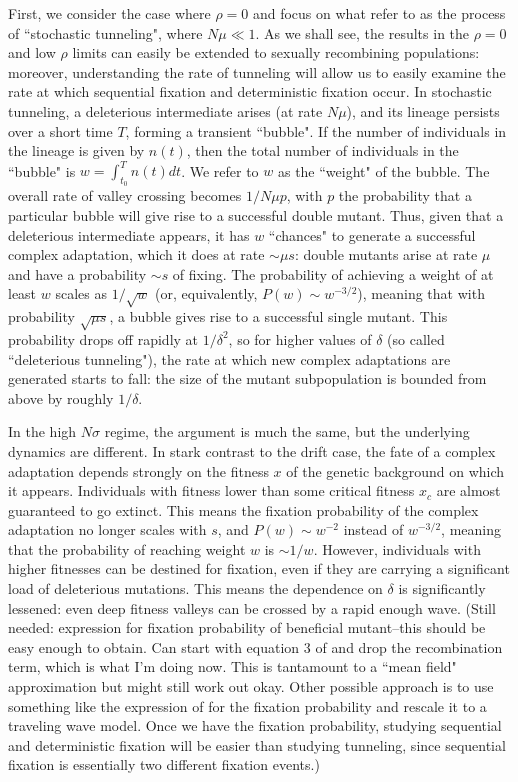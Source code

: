\documentclass[rmp]{revtex4}
\begin{document}
\iffalse
First, we consider the case where $\rho = 0$ and focus on what \citet{weissman_2009} refer to as the process of ``stochastic tunneling", where $N\mu \ll 1$.
As we shall see, the results in the $\rho = 0$ and low $\rho$ limits can easily be extended to sexually recombining populations: moreover, understanding the rate of tunneling will allow us to easily examine the rate at which sequential fixation and deterministic fixation occur.
In stochastic tunneling, a deleterious intermediate arises (at rate $N\mu$), and its lineage persists over a short time $T$, forming a transient ``bubble".
If the number of individuals in the lineage is given by $n(t)$, then the total number of individuals in the ``bubble" is $w = \int_{t_0}^T n(t) dt$.
We refer to $w$ as the ``weight" of the bubble.
The overall rate of valley crossing becomes $1/N\mu p$, with $p$ the probability that a particular bubble will give rise to a successful double mutant.
Thus, given that a deleterious intermediate appears, it has $w$ ``chances" to generate a successful complex adaptation, which it does at rate $\sim \mu s$: double mutants arise at rate $\mu$ and have a probability $\sim s$ of fixing.
The probability of achieving a weight of at least $w$ scales as $1/\sqrt{w}$ (or, equivalently, $P(w) \sim w^{-3/2}$), meaning that with probability $\sqrt{\mu s}$, a bubble gives rise to a successful single mutant.
This probability drops off rapidly at $1/\delta^2$, so for higher values of $\delta$ (so called ``deleterious tunneling"), the rate at which new complex adaptations are generated starts to fall: the size of the mutant subpopulation is bounded from above by roughly $1/\delta$.

In the high $N\sigma$ regime, the argument is much the same, but the underlying dynamics are different.
In stark contrast to the drift case, the fate of a complex adaptation depends strongly on the fitness $x$ of the genetic background on which it appears.
Individuals with fitness lower than some critical fitness $x_c$ are almost guaranteed to go extinct.
This means the fixation probability of the complex adaptation no longer scales with $s$, and $P(w) \sim w^{-2}$ instead of $w^{-3/2}$, meaning that the probability of reaching weight $w$ is $\sim 1/w$.
However, individuals with higher fitnesses can be destined for fixation, even if they are carrying a significant load of deleterious mutations.
This means the dependence on $\delta$ is significantly lessened: even deep fitness valleys can be crossed by a rapid enough wave.
(Still needed: expression for fixation probability of beneficial mutant--this should be easy enough to obtain.
Can start with equation 3 of \citet{neher_shraiman_2011} and drop the recombination term, which is what I'm doing now.
This is tantamount to a ``mean field" approximation but might still work out okay.
Other possible approach is to use something like the expression of  \citet{desai_fisher_2007} for the fixation probability and rescale it to a traveling wave model.
Once we have the fixation probability, studying sequential and deterministic fixation will be easier than studying tunneling, since sequential fixation is essentially two different fixation events.)
\end{document}
